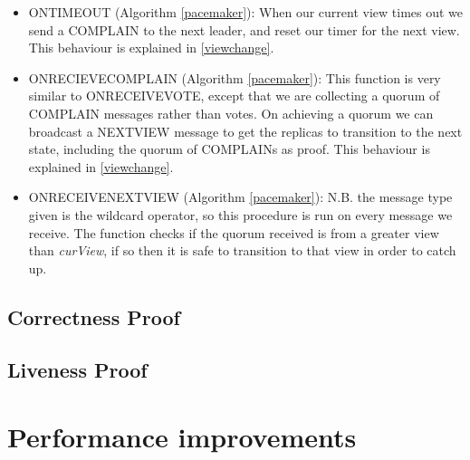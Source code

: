 \begin{itemize}
	\item ON{\large T}IMEOUT (Algorithm \ref{pacemaker}): When our current view times out we send a COMPLAIN to the next leader, and reset our timer for the next view. This behaviour is explained in \ref{viewchange}.
	\item ON{\large R}ECIEVE{\large C}OMPLAIN (Algorithm \ref{pacemaker}): This function is very similar to ON{\large R}ECEIVE{\large V}OTE, except that we are collecting a quorum of COMPLAIN messages rather than votes. On achieving a quorum we can broadcast a NEXT{\large V}IEW message to get the replicas to transition to the next state, including the quorum of COMPLAINs as proof. This behaviour is explained in \ref{viewchange}.
	\item ON{\large R}ECEIVE{\large N}EXT{\large V}IEW (Algorithm \ref{pacemaker}): N.B. the message type given is the wildcard operator, so this procedure is run on every message we receive. The function checks if the quorum received is from a greater view than \textit{curView}, if so then it is safe to transition to that view in order to catch up.
\end{itemize}

\subsection{Correctness Proof}

\subsection{Liveness Proof}
\section{Performance improvements} \label{deadlock}

